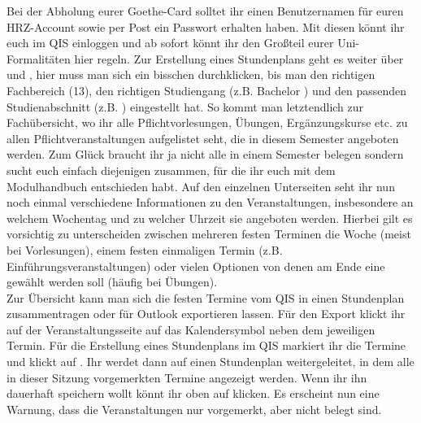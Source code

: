Bei der Abholung eurer Goethe-Card solltet ihr einen Benutzernamen für euren HRZ-Account sowie per Post ein Passwort erhalten haben. Mit diesen könnt ihr euch im QIS einloggen und ab sofort könnt ihr den Großteil eurer Uni-Formalitäten hier regeln. Zur Erstellung eines Stundenplans geht es weiter über  und , hier muss man sich ein bisschen durchklicken, bis man den richtigen Fachbereich (13), den richtigen Studiengang (z.B. Bachelor ) und den passenden Studienabschnitt (z.B. ) eingestellt hat. So kommt man letztendlich zur Fachübersicht, wo ihr alle Pflichtvorlesungen, Übungen, Ergänzungskurse etc. zu allen Pflichtveranstaltungen aufgelistet seht, die in diesem Semester angeboten werden. Zum Glück braucht ihr ja nicht alle in einem Semester belegen sondern sucht euch einfach diejenigen zusammen, für die ihr euch mit dem Modulhandbuch entschieden habt. Auf den einzelnen Unterseiten seht ihr nun noch einmal verschiedene Informationen zu den Veranstaltungen, insbesondere an welchem Wochentag und zu welcher Uhrzeit sie angeboten werden. Hierbei gilt es vorsichtig zu unterscheiden zwischen mehreren festen Terminen die Woche (meist bei Vorlesungen), einem festen einmaligen Termin (z.B. Einführungsveranstaltungen) oder vielen Optionen von denen am Ende eine gewählt werden soll (häufig bei Übungen).\\
Zur Übersicht kann man sich die festen Termine vom QIS in einen Stundenplan zusammentragen oder für Outlook exportieren lassen. Für den Export klickt ihr auf der Veranstaltungsseite auf das Kalendersymbol neben dem jeweiligen Termin. Für die Erstellung eines Stundenplans im QIS markiert ihr die Termine und klickt auf . Ihr werdet dann auf einen Stundenplan weitergeleitet, in dem alle in dieser Sitzung vorgemerkten Termine angezeigt werden. Wenn ihr ihn dauerhaft speichern wollt könnt ihr oben auf  klicken. Es erscheint nun eine Warnung, dass die Veranstaltungen nur vorgemerkt, aber nicht belegt sind.
